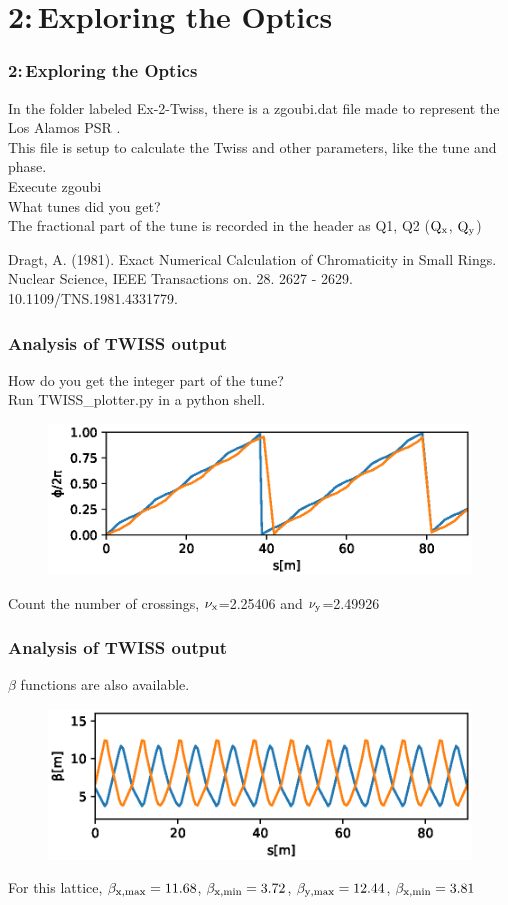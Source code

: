 \documentclass{beamer}
\begin{document}
\section{2:\,Exploring the Optics}

\begin{frame}
\frametitle{2:\,Exploring the Optics}
In the folder labeled Ex-2-Twiss, there is a zgoubi.dat file made to represent the Los Alamos PSR \cite{AD1}.\\
This file is setup to calculate the Twiss and other parameters, like the tune and phase.\\ 
Execute zgoubi\\
What tunes did you get?\\
\hspace*{1em}The fractional part of the tune is recorded in the header as Q1, Q2 ($\rm Q_x$, $\rm Q_y$)
\vfill

\footnoterule
\tiny
\cite{AD1} Dragt, A. (1981). Exact Numerical Calculation of Chromaticity in Small Rings. Nuclear Science, IEEE Transactions on. 28. 2627 - 2629. 10.1109/TNS.1981.4331779. 
\end{frame}
\begin{frame}
\frametitle{Analysis of TWISS output}
How do you get the integer part of the tune?\\
Run TWISS\_plotter.py in a python shell.
\begin{figure}
\includegraphics[width=1.0\textwidth]{phi.eps}
\end{figure}
Count the number of crossings, $\rm \nu_x$=2.25406 and $\rm \nu_y$=2.49926\\
\end{frame}
\begin{frame}
\frametitle{Analysis of TWISS output}
$\beta$ functions are also available.
\begin{figure}
\includegraphics[width=1.0\textwidth]{beta.eps}
\end{figure}
For this lattice, $\rm \beta_{x,max}=11.68$, $\rm \beta_{x,min}=3.72$, $\rm \beta_{y,max}=12.44$, $\rm \beta_{x,min}=3.81$
\end{frame}
\end{document}
